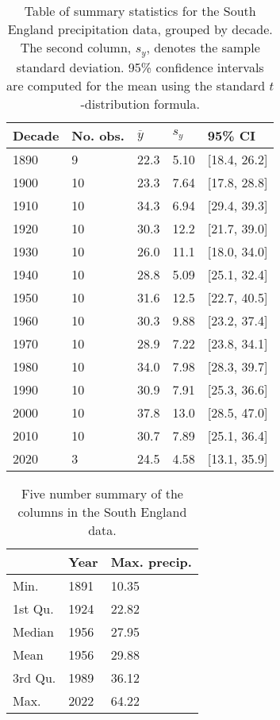 \documentclass[12pt, a4paper]{article}
\begin{document}
  \begin{table}
    \centering
    \caption{Table of summary statistics for the South England precipitation
    data, grouped by decade. The second column, \(s_y\), denotes the sample
    standard deviation. 95\% confidence intervals are computed for the mean 
    using the standard \(t\)-distribution formula.}
    \begin{tabularx}{\textwidth}{XXXXX}
      \toprule
      Decade & No. obs. & \(\overline y\)  & \(s_y\) & 95\% CI \\
      \midrule
      1890 &  9 & 22.3 & 5.10 & [18.4, 26.2]\\
      1900 & 10 & 23.3 & 7.64 & [17.8, 28.8]\\
      1910 & 10 & 34.3 & 6.94 & [29.4, 39.3]\\
      1920 & 10 & 30.3 & 12.2 & [21.7, 39.0]\\
      1930 & 10 & 26.0 & 11.1 & [18.0, 34.0]\\
      1940 & 10 & 28.8 & 5.09 & [25.1, 32.4]\\
      1950 & 10 & 31.6 & 12.5 & [22.7, 40.5]\\
      1960 & 10 & 30.3 & 9.88 & [23.2, 37.4]\\
      1970 & 10 & 28.9 & 7.22 & [23.8, 34.1]\\
      1980 & 10 & 34.0 & 7.98 & [28.3, 39.7]\\
      1990 & 10 & 30.9 & 7.91 & [25.3, 36.6]\\
      2000 & 10 & 37.8 & 13.0 & [28.5, 47.0]\\
      2010 & 10 & 30.7 & 7.89 & [25.1, 36.4]\\
      2020 &  3 & 24.5 & 4.58 & [13.1, 35.9]\\
      \bottomrule
    \end{tabularx}
    \label{tab:precip_summary}
  \end{table}

  \begin{table}
    \centering
    \caption{Five number summary of the columns in the South England data.}
    \begin{tabularx}{\textwidth}{XXX}
      \toprule
      & Year & Max. precip. \\
      \midrule
      Min. & 1891 & 10.35 \\
      1st Qu. & 1924 & 22.82 \\
      Median & 1956 & 27.95 \\
      Mean & 1956 & 29.88 \\
      3rd Qu. & 1989 & 36.12 \\
      Max. & 2022 & 64.22 \\
      \bottomrule
    \end{tabularx}
  \end{table}
  
\end{document}
